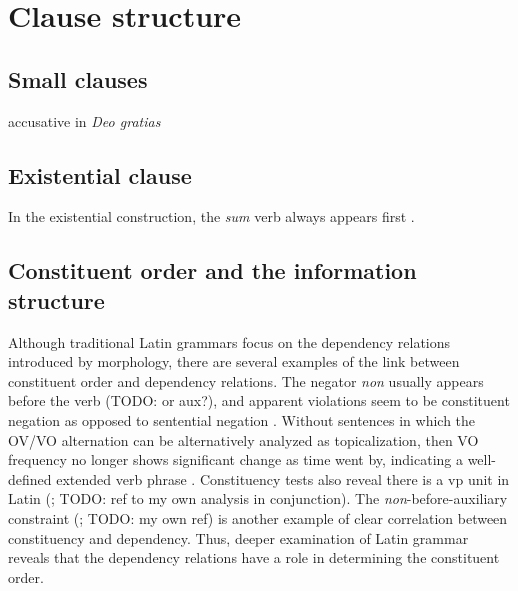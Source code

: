 \documentclass[a4paper, oneside]{report}
\newcommand*{\citesec}[1]{\S~{#1}}
\newcommand*{\citepage}[1]{p.~{#1}}
\newcommand{\form}[1]{\emph{#1}}
\begin{document}
\chapter{Clause structure}

\section{Small clauses}

accusative in \form{Deo gratias}

\section{Existential clause}\label{sec:clause.exist}

In the existential construction,
the \form{sum} verb always appears first
\citep[\citepage{396}]{allen1903allen}.

\section{Constituent order and the information structure}\label{sec:clause.order}

Although traditional Latin grammars focus on the dependency relations 
introduced by morphology,
there are several examples of the link between constituent order and dependency relations.
The negator \form{non} usually appears before the verb (TODO: or aux?),
and apparent violations seem to be constituent negation 
as opposed to sentential negation \citep[\citepage{43}]{danckaert2017development}.
Without sentences in which the OV/VO alternation 
can be alternatively analyzed as topicalization,
then VO frequency no longer shows significant change as time went by,
indicating a well-defined extended verb phrase \citep[\citesec{1.5}, \citepage{29}]{danckaert2017development}.
Constituency tests also reveal there is a \acs{vp} unit in Latin 
(\citealt[\citesec{1.6}]{danckaert2017development}; TODO: ref to my own analysis in conjunction).
The \form{non}-before-auxiliary constraint 
(\citealt[\citesec{1.5}]{danckaert2017development}; TODO: my own ref)
is another example of clear correlation between 
constituency and dependency.
Thus, deeper examination of Latin grammar reveals that 
the dependency relations have a role in determining the constituent order.
\end{document}
